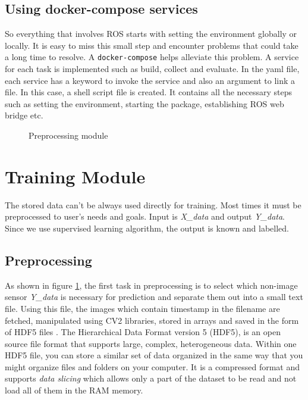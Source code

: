 \subsection{Using docker-compose services}
So everything that involves ROS starts with setting the environment globally or locally.
It is easy to miss this small step and encounter problems that could take a long time to
resolve. A \texttt{docker-compose} helps alleviate this problem. A service for each task
is implemented such as build, collect and evaluate. In the yaml file, each service has a
keyword to invoke the service and also an argument to link a file. In this case, a
shell script file is created. It contains all the necessary steps
such as setting the environment, starting the package, establishing ROS web bridge etc.
\fi

\begin{figure}[!ht]
	\centering
    \def\svgwidth{0.5\textwidth}
    \caption{Preprocessing module}
    \label{fig:preprocessing}
\end{figure}

\section{Training Module}

The stored data can't be always used directly for training. Most times it must be
preprocessed to user's needs and goals. Input is \textit{X\_{data}} and output
\textit{Y\_{data}}. Since we use supervised learning algorithm, the output is known and
labelled.

\subsection{Preprocessing}
As shown in figure \ref{fig:preprocessing}, the first task in preprocessing is to select which non-image sensor \textit{Y\_{data}} is necessary for prediction
and separate them out into a small text file. Using this file, the images which contain
timestamp in the filename are fetched, manipulated using CV2 libraries, stored in arrays and saved in the form of HDF5 files
\cite{hdf5file}. The Hierarchical Data Format version 5 (HDF5), is an open source file format
that supports large, complex, heterogeneous data. Within one HDF5 file, you can store a similar set of data organized in the same way that you might organize files and folders on your computer.
It is a compressed format and supports \textit{data slicing} which allows only a part of
the dataset to be read and not load all of them in the RAM memory.

